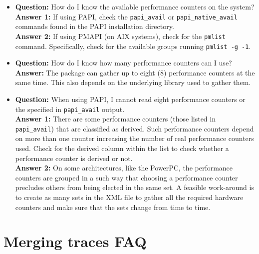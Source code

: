 \begin{itemize}

\item {\bf Question:} How do I know the available performance counters on the system?\\
      {\bf Answer 1:} If using PAPI, check the {\tt papi\_avail} or {\tt papi\_native\_avail} commands found in the PAPI installation directory.\\
      {\bf Answer 2:} If using PMAPI (on AIX systems), check for the {\tt pmlist} command. Specifically, check for the available groups running {\tt pmlist -g -1}.

\item {\bf Question:} How do I know how many performance counters can I use?\\
      {\bf Answer:  } The \TRACE package can gather up to eight (8) performance counters at the same time. This also depends on the underlying library used to gather them.

\item {\bf Question:} When using PAPI, I cannot read eight performance counters or the specified in {\tt papi\_avail} output.\\
      {\bf Answer 1:} There are some performance counters (those listed in {\tt papi\_avail}) that are classified as derived. Such performance counters depend on more than one counter increasing the number of real performance counters used. Check for the derived column within the list to check whether a performance counter is derived or not.\\
			{\bf Answer 2:} On some architectures, like the PowerPC, the performance counters are grouped in a such way that choosing a performance counter precludes others from being elected in the same set. A feasible work-around is to create as many sets in the XML file to gather all the required hardware counters and make sure that the sets change from time to time.


\end{itemize}

\section{Merging traces FAQ}

